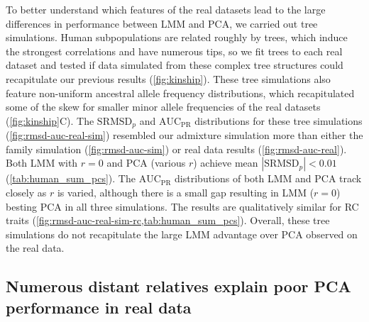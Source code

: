 \documentclass[11pt]{article}
\newcommand{\rmsd}{\text{SRMSD}_p}
\newcommand{\auc}{\text{AUC}_\text{PR}}
\begin{document}
\begin{linenumbers}
To better understand which features of the real datasets lead to the large differences in performance between LMM and PCA, we carried out tree simulations.
Human subpopulations are related roughly by trees, which induce the strongest correlations and have numerous tips, so we fit trees to each real dataset and tested if data simulated from these complex tree structures could recapitulate our previous results (\cref{fig:kinship}).
These tree simulations also feature non-uniform ancestral allele frequency distributions, which recapitulated some of the skew for smaller minor allele frequencies of the real datasets (\cref{fig:kinship}C).
The $\rmsd$ and $\auc$ distributions for these tree simulations (\cref{fig:rmsd-auc-real-sim}) resembled our admixture simulation more than either the family simulation (\cref{fig:rmsd-auc-sim}) or real data results (\cref{fig:rmsd-auc-real}).
Both LMM with $r=0$ and PCA (various $r$) achieve mean $|\rmsd| < 0.01$ (\cref{tab:human_sum_pcs}).
The $\auc$ distributions of both LMM and PCA track closely as $r$ is varied, although there is a small gap resulting in LMM ($r=0$) besting PCA in all three simulations.
The results are qualitatively similar for RC traits (\cref{fig:rmsd-auc-real-sim-rc,tab:human_sum_pcs}).
Overall, these tree simulations do not recapitulate the large LMM advantage over PCA observed on the real data.

\subsection{Numerous distant relatives explain poor PCA performance in real data}


\end{linenumbers}
\end{document}
